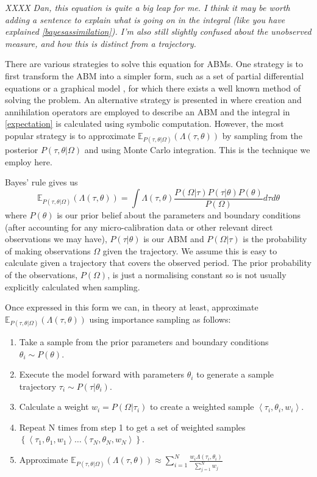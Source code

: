 \documentclass{article}
\begin{document}
\textit{XXXX Dan, this equation is quite a big leap for me. I think it may be worth adding a sentence to explain what is going on in the integral (like you have explained \eqref{bayesassimilation}). I'm also still slightly confused about the unobserved measure, and how this is distinct from a trajectory.}

There are various strategies to solve this equation for ABMs. One strategy is to first transform the ABM into a simpler form, such as a set of partial differential equations \citep{lloyd_exploring_2016} or a graphical model \citep{liao2010integrated}, for which there exists a well known method of solving the problem. An alternative strategy is presented in \citet{tang2019data} where creation and annihilation operators are employed to describe an ABM and the integral in \eqref{expectation} is calculated using symbolic computation. However, the most popular strategy is to approximate $\mathbb{E}_{P(\tau,\theta|\Omega)}(\Lambda(\tau,\theta))$ by sampling from the posterior $P(\tau,\theta|\Omega)$ and using Monte Carlo integration. This is the technique we employ here.

Bayes' rule gives us
\begin{equation}
\mathbb{E}_{P(\tau,\theta|\Omega)}(\Lambda(\tau,\theta)) = \int \Lambda(\tau,\theta) \frac{P(\Omega|\tau)P(\tau|\theta)P(\theta)}{P(\Omega)} d\tau d\theta
\label{bayesassimilation}
\end{equation}
where $P(\theta)$ is our prior belief about the parameters and boundary conditions (after accounting for any micro-calibration data or other relevant direct observations we may have), $P(\tau|\theta)$ is our ABM and $P(\Omega|\tau)$ is the probability of making observations $\Omega$ given the trajectory. We assume this is easy to calculate given a trajectory that covers the observed period. The prior probability of the observations, $P(\Omega)$, is just a normalising constant so is not usually explicitly calculated when sampling.

Once expressed in this form we can, in theory at least, approximate $\mathbb{E}_{P(\tau,\theta|\Omega)}(\Lambda(\tau,\theta))$ using importance sampling as follows:
\begin{enumerate}
\item Take a sample from the prior parameters and boundary conditions $\theta_i \sim P(\theta)$.
\item Execute the model forward with parameters $\theta_i$ to generate a sample trajectory $\tau_{i} \sim P(\tau|\theta_i)$.
\item Calculate a weight $w_i = P(\Omega|\tau_i)$ to create a weighted sample $\left<\tau_{i},\theta_i, w_i\right>$.
\item Repeat  N times from step 1 to get a set of weighted samples $\left\{\left<\tau_1,\theta_1,w_1\right> \dots \left<\tau_N,\theta_N,w_N\right> \right\}$.
\item Approximate $\mathbb{E}_{P(\tau,\theta|\Omega)}(\Lambda(\tau,\theta)) \approx \sum_{i=1}^N \frac{w_i\Lambda(\tau_i,\theta_i) }{\sum_{j=1}^Nw_j}$
\end{enumerate}
\end{document}

